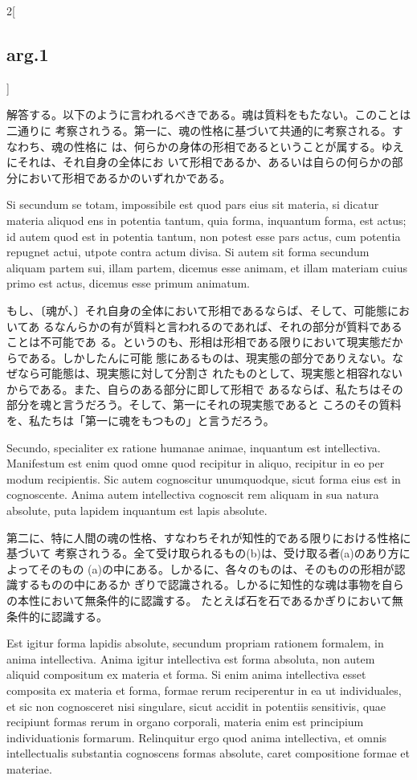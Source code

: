 \documentclass[paper=a4paper,fontsize=10pt,jafontsize=9pt,titlepage]{jlreq}
\begin{document}
\begin{paracol}{2}[\subsection{arg.1}]
\switchcolumn

解答する。以下のように言われるべきである。魂は質料をもたない。このことは二通りに
考察されうる。第一に、魂の性格に基づいて共通的に考察される。すなわち、魂の性格に
は、何らかの身体の形相であるということが属する。ゆえにそれは、それ自身の全体にお
いて形相であるか、あるいは自らの何らかの部分において形相であるかのいずれかである。

\switchcolumn*

Si secundum se totam, impossibile est quod pars eius sit materia, si dicatur
materia aliquod ens in potentia tantum, quia forma, inquantum forma, est actus;
id autem quod est in potentia tantum, non potest esse pars actus, cum potentia
repugnet actui, utpote contra actum divisa. Si autem sit forma secundum aliquam
partem sui, illam partem, dicemus esse animam, et illam materiam cuius primo est
actus, dicemus esse primum animatum.

\switchcolumn

もし、〔魂が、〕それ自身の全体において形相であるならば、そして、可能態においてあ
るなんらかの有が質料と言われるのであれば、それの部分が質料であることは不可能であ
る。というのも、形相は形相である限りにおいて現実態だからである。しかしたんに可能
態にあるものは、現実態の部分でありえない。なぜなら可能態は、現実態に対して分割さ
れたものとして、現実態と相容れないからである。また、自らのある部分に即して形相で
あるならば、私たちはその部分を魂と言うだろう。そして、第一にそれの現実態であると
ころのその質料を、私たちは「第一に魂をもつもの」と言うだろう。

\switchcolumn*

Secundo, specialiter ex ratione humanae animae, inquantum est
intellectiva. Manifestum est enim quod omne quod recipitur in aliquo, recipitur
in eo per modum recipientis. Sic autem cognoscitur unumquodque, sicut forma eius
est in cognoscente. Anima autem intellectiva cognoscit rem aliquam in sua natura
absolute, puta lapidem inquantum est lapis absolute.

\switchcolumn

第二に、特に人間の魂の性格、すなわちそれが知性的である限りにおける性格に基づいて
考察されうる。全て受け取られるもの(b)は、受け取る者(a)のあり方によってそのもの
(a)の中にある。しかるに、各々のものは、そのものの形相が認識するものの中にあるか
ぎりで認識される。しかるに知性的な魂は事物を自らの本性において無条件的に認識する。
たとえば石を石であるかぎりにおいて無条件的に認識する。

\switchcolumn*

Est igitur forma lapidis absolute, secundum propriam rationem formalem, in anima
intellectiva. Anima igitur intellectiva est forma absoluta, non autem aliquid
compositum ex materia et forma. Si enim anima intellectiva esset composita ex
materia et forma, formae rerum reciperentur in ea ut individuales, et sic non
cognosceret nisi singulare, sicut accidit in potentiis sensitivis, quae
recipiunt formas rerum in organo corporali, materia enim est principium
individuationis formarum. Relinquitur ergo quod anima intellectiva, et omnis
intellectualis substantia cognoscens formas absolute, caret compositione formae
et materiae.


\end{paracol}
\end{document}
